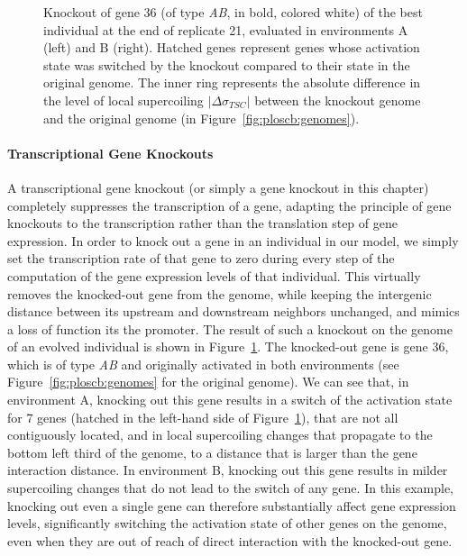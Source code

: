 \begin{figure}[H]
\centering
\begin{elasticrow}[width=\linewidth]
\end{elasticrow}
\caption[Example evolved individual with a knocked-out gene, evaluated in both environments]{Knockout of gene 36 (of type \emph{AB}, in bold, colored white) of the best individual at the end of replicate 21, evaluated in environments A (left) and B (right).
Hatched genes represent genes whose activation state was switched by the knockout compared to their state in the original genome.
The inner ring represents the absolute difference in the level of local supercoiling $|\Delta\sigma_{TSC}|$ between the knockout genome and the original genome (in Figure~\ref{fig:ploscb:genomes}).}
\label{fig:ploscb:ko_genomes}
\end{figure}

\paragraph{Transcriptional Gene Knockouts}
A transcriptional gene knockout (or simply a gene knockout in this chapter) completely suppresses the transcription of a gene, adapting the principle of gene knockouts to the transcription rather than the translation step of gene expression.
In order to knock out a gene in an individual in our model, we simply set the transcription rate of that gene to zero during every step of the computation of the gene expression levels of that individual.
This virtually removes the knocked-out gene from the genome, while keeping the intergenic distance between its upstream and downstream neighbors unchanged, and mimics a loss of function its the promoter.
The result of such a knockout on the genome of an evolved individual is shown in Figure~\ref{fig:ploscb:ko_genomes}.
The knocked-out gene is gene 36, which is of type \emph{AB} and originally activated in both environments (see Figure~\ref{fig:ploscb:genomes} for the original genome).
We can see that, in environment A, knocking out this gene results in a switch of the activation state for 7 genes (hatched in the left-hand side of Figure~\ref{fig:ploscb:ko_genomes}), that are not all contiguously located, and in local supercoiling changes that propagate to the bottom left third of the genome, to a distance that is larger than the gene interaction distance.
In environment B, knocking out this gene results in milder supercoiling changes that do not lead to the switch of any gene.
In this example, knocking out even a single gene can therefore substantially affect gene expression levels, significantly switching the activation state of other genes on the genome, even when they are out of reach of direct interaction with the knocked-out gene.

